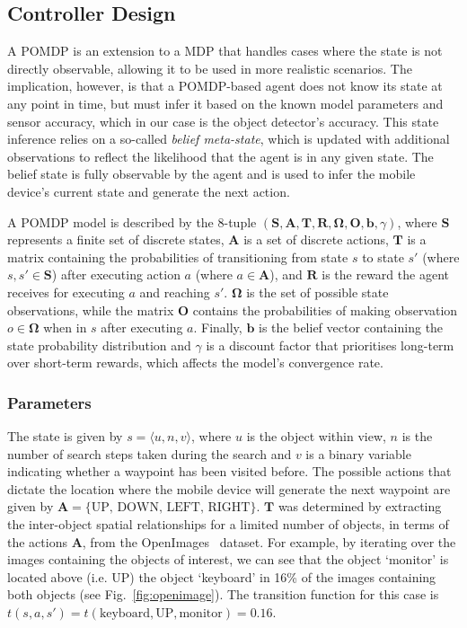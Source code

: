 \documentclass[runningheads]{llncs}
\begin{document}
\subsection{Controller Design}

A POMDP is an extension to a MDP that handles cases where the state is not directly observable, allowing it to be used in more realistic scenarios. 
The implication, however, is that a POMDP-based agent does not know its state at any point in time, but must infer it based on the known model parameters and sensor accuracy, which in our case is the object detector's accuracy.
This state inference relies on a so-called {\em belief meta-state}, which is updated with additional observations to reflect the likelihood that the agent is in any given state.
The belief state is fully observable by the agent and is used to infer the mobile device's current state and generate the next action.

A POMDP model is described by the 8-tuple $(\mathbf{S}, \mathbf{A}, \mathbf{T}, \mathbf{R}, \mathbf{\Omega}, \mathbf{O}, \mathbf{b}, \gamma)$, where $\mathbf{S}$ represents a finite set of discrete states, $\mathbf{A}$ is a set of discrete actions, $\mathbf{T}$ is a matrix containing the probabilities of transitioning from state $s$ to state $s'$ (where $s, s' \in \mathbf{S}$) after executing action $a$ (where $a \in \mathbf{A}$), and $\mathbf{R}$ is the reward the agent receives for executing $a$ and reaching $s'$.
$\mathbf{\Omega}$ is the set of possible state observations, while the matrix $\mathbf{O}$ contains the probabilities of making observation $o \in \mathbf{\Omega}$ when in $s$ after executing $a$.
Finally, $\mathbf{b}$ is the belief vector containing the state probability distribution and $\gamma$ is a discount factor that prioritises long-term over short-term rewards, which affects the model's convergence rate. 

\subsubsection{Parameters}

The state is given by $s = \langle u, n, v \rangle$, where $u$ is the object within view, $n$ is the number of search steps taken during the search and $v$ is a binary variable indicating whether a waypoint has been visited before.
The possible actions that dictate the location where the mobile device will generate the next waypoint are given by $\mathbf{A} = \{ \textrm{UP, DOWN, LEFT, RIGHT} \}$.
$\mathbf{T}$ was determined by extracting the inter-object spatial relationships for a limited number of objects, in terms of the actions $\mathbf{A}$, from the OpenImages~\cite{openimages} dataset. 
For example, by iterating over the images containing the objects of interest, we can see that the object `monitor' is located above (i.e. UP) the object `keyboard' in 16\% of the images containing both objects (see Fig.~\ref{fig:openimage}). 
The transition function for this case is $t(s, a, s') = t(\textrm{keyboard}, \textrm{UP}, \textrm{monitor}) = 0.16$.
\end{document}
